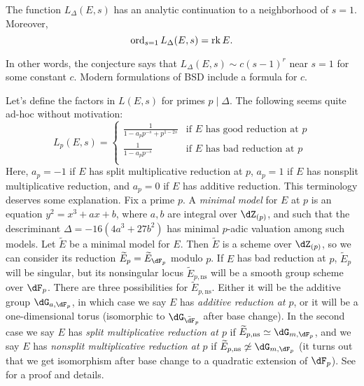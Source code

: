 \documentclass{article}
\begin{document}
\begin{conjecture}
The function $L_\Delta(E,s)$ has an analytic continuation to a neighborhood of 
$s=1$. Moreover, 
\[
  \operatorname{ord}_{s=1} L_\Delta(E,s) = \operatorname{rk} E \text{.}
\]
\end{conjecture}

In other words, the conjecture says that $L_\Delta(E,s)\sim c(s-1)^r$ near 
$s=1$ for some constant $c$. Modern formulations of BSD include a formula for 
$c$. 

Let's define the factors in $L(E,s)$ for primes $p\mid \Delta$. The following 
seems quite ad-hoc without motivation:
\[
  L_p(E,s)
    = \begin{cases}
        \displaystyle\frac{1}{1-a_p p^{-s} + p^{1-2 s}} & \text{if $E$ has good reduction at $p$}  \\
        \displaystyle\frac{1}{1-a_p p^{-s}} & \text{if $E$ has bad reduction at $p$} \\
      \end{cases}
\]
Here, $a_p=-1$ if $E$ has split multiplicative reduction at $p$, 
$a_p=1$ if $E$ has nonsplit multiplicative reduction, and $a_p=0$ if $E$ has 
additive reduction. 
This terminology deserves some explanation. Fix a prime $p$. A \emph{minimal 
model} for $E$ at $p$ is an equation $y^2=x^3+a x+b$, where $a,b$ are integral 
over $\dZ_{(p)}$, and such that the descriminant $\Delta=-16(4 a^3+27 b^2)$ has 
minimal $p$-adic valuation among such models. Let $\widetilde E$ be a minimal 
model for $E$. Then $\widetilde E$ is a scheme over $\dZ_{(p)}$, so we can 
consider its reduction $\widetilde E_p=\widetilde E_{\dF_p}$ modulo $p$. If 
$E$ has bad reduction at $p$, $\widetilde E_p$ will be singular, but its 
nonsingular locus $\widetilde E_{p,\text{ns}}$ will be a smooth group scheme 
over $\dF_p$. There are three possibilities for $\widetilde E_{p,\text{ns}}$. 
Either it will be the additive group $\dG_{a,\dF_p}$, in which case we say 
$E$ has \emph{additive reduction at $p$}, or it will be a one-dimensional 
torus (isomorphic to $\dG_{\bar\dF_p}$ after base change). In the second 
case we say $E$ has \emph{split multiplicative reduction at $p$} if 
$\widetilde E_{p,\text{ns}}\simeq \dG_{m,\dF_p}$, and we say $E$ has 
\emph{nonsplit multiplicative reduction at $p$} if 
$\widetilde E_{p,\text{ns}}\not\simeq \dG_{m,\dF_p}$ (it turns out that 
we get isomorphism after base change to a quadratic extension of 
$\dF_p$). See \cite[III.2.5, 2.6]{si06} for a proof and details.  
\end{document}
